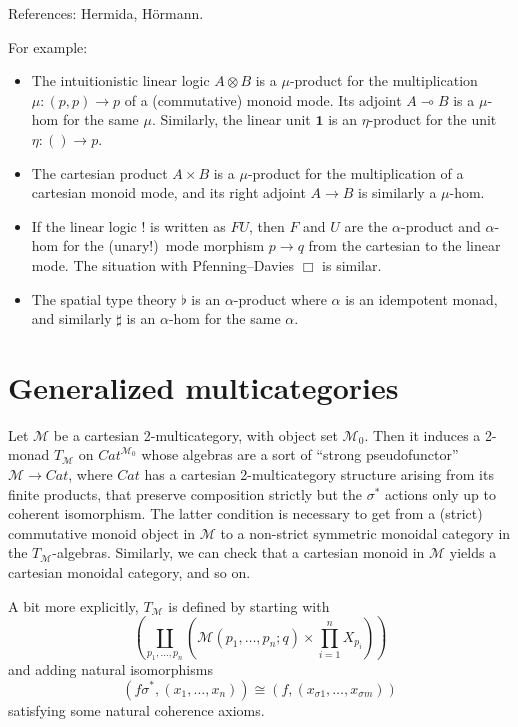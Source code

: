 \documentclass{amsart}
\theoremstyle{definition}
\def\M{\mathcal{M}}
\begin{document}
References: Hermida, H\"{o}rmann.

For example:
\begin{itemize}
\item The intuitionistic linear logic $A \otimes B$ is a $\mu$-product for the multiplication $\mu:(p,p)\to p$ of a (commutative) monoid mode.
  Its adjoint $A\multimap B$ is a $\mu$-hom for the same $\mu$.
  Similarly, the linear unit $\mathbf{1}$ is an $\eta$-product for the unit $\eta :()\to p$.
\item The cartesian product $A\times B$ is a $\mu$-product for the multiplication of a cartesian monoid mode, and its right adjoint $A\to B$ is similarly a $\mu$-hom.
\item If the linear logic $!$ is written as $F U$, then $F$ and $U$ are the $\alpha$-product and $\alpha$-hom for the (unary!)\ mode morphism $p\to q$ from the cartesian to the linear mode.
  The situation with Pfenning--Davies $\Box$ is similar.
\item The spatial type theory $\flat$ is an $\alpha$-product where $\alpha$ is an idempotent monad, and similarly $\sharp$ is an $\alpha$-hom for the same $\alpha$.
\end{itemize}


\section{Generalized multicategories}
\label{sec:genmulti}

Let $\M$ be a cartesian 2-multicategory, with object set $\M_0$.
Then it induces a 2-monad $T_\M$ on $\mathit{Cat}^{\M_0}$ whose algebras are a sort of ``strong pseudofunctor'' $\M\to \mathit{Cat}$, where $\mathit{Cat}$ has a cartesian 2-multicategory structure arising from its finite products, that preserve composition strictly but the $\sigma^*$ actions only up to coherent isomorphism.
The latter condition is necessary to get from a (strict) commutative monoid object in $\M$ to a non-strict symmetric monoidal category in the $T_\M$-algebras.
Similarly, we can check that a cartesian monoid in $\M$ yields a cartesian monoidal category, and so on.

A bit more explicitly, $T_\M$ is defined by starting with
\begin{equation*}
  \left(\coprod_{p_1,\dots,p_n} \left(\M(p_1,\dots,p_n;q) \times \prod_{i=1}^n X_{p_i} \right)\right)
\end{equation*}
and adding natural isomorphisms
\[ (f\sigma^*,(x_1,\dots,x_n))\cong (f,(x_{\sigma 1},\dots,x_{\sigma m})) \]
satisfying some natural coherence axioms.
\end{document}
